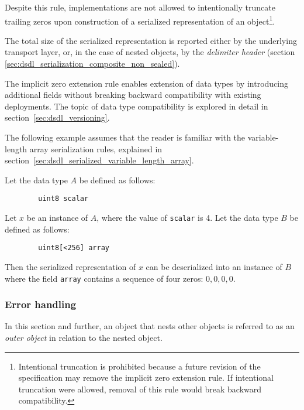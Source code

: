 Despite this rule, implementations are not allowed to intentionally truncate trailing zeros
upon construction of a serialized representation of an object\footnote{%
    Intentional truncation is prohibited because a future revision of the specification may remove the implicit zero
    extension rule.
    If intentional truncation were allowed, removal of this rule would break backward compatibility.
}.

The total size of the serialized representation is reported either by the underlying transport layer, or,
in the case of nested objects, by the \emph{delimiter header}
(section \ref{sec:dsdl_serialization_composite_non_sealed}).

\begin{remark}
    The implicit zero extension rule enables extension of data types by introducing additional fields
    without breaking backward compatibility with existing deployments.
    The topic of data type compatibility is explored in detail in section~\ref{sec:dsdl_versioning}.

    The following example assumes that the reader is familiar with the variable-length array serialization rules,
    explained in section~\ref{sec:dsdl_serialized_variable_length_array}.

    Let the data type $A$ be defined as follows:

    \begin{verbatim}
        uint8 scalar
    \end{verbatim}

    Let $x$ be an instance of $A$, where the value of \verb|scalar| is 4.
    Let the data type $B$ be defined as follows:

    \begin{verbatim}
        uint8[<256] array
    \end{verbatim}

    Then the serialized representation of $x$ can be deserialized into an instance of $B$ where the field
    \verb|array| contains a sequence of four zeros: $0, 0, 0, 0$.
\end{remark}

\subsubsection{Error handling}\label{sec:dsdl_serialized_error}

In this section and further, an object that nests other objects is referred to as an \emph{outer object}
in relation to the nested object.


